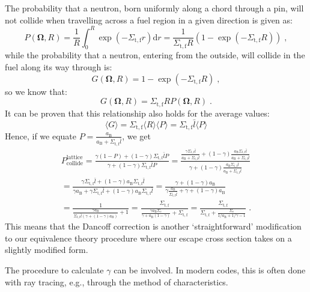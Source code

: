 The probability that a neutron, born uniformly along a chord through a pin, will not collide when travelling across a fuel region in a given direction is given as:
\begin{equation*}
    P(\mathbf{\Omega},R) = \frac{1}{R}\int^R_0 \exp\left(-\Sigma_\mathrm{t,f}r\right)\mathrm{d}r = \frac{1}{\Sigma_\mathrm{t,f}R}\left(1- \exp\left(-\Sigma_\mathrm{t,f}R\right)\right)\;\mathrm{,}
\end{equation*}
 while the probability that a neutron, entering from the outside, will collide in the fuel along its way through is:
\begin{equation*}
    G(\mathbf{\Omega},R) = 1-\exp\left(-\Sigma_\mathrm{t,f}R\right)\;\mathrm{,}
\end{equation*}
so we know that:
\begin{equation*}
    G(\mathbf{\Omega},R) = \Sigma_\mathrm{t,f}RP(\mathbf{\Omega},R)\;\mathrm{.}
\end{equation*}
It can be proven that this relationship also holds for the average values:
\begin{equation}
    \langle G\rangle = \Sigma_\mathrm{t,f}\langle R \rangle\langle P\rangle = \Sigma_\mathrm{t,f}\bar{l}\langle P\rangle
\end{equation}
Hence, if we equate $P = \frac{a_\mathrm{B}}{a_\mathrm{B} + \Sigma_\mathrm{t,f}\bar{l}}$, we get
\begin{equation*}
\begin{split}
    P^\mathrm{lattice}_\mathrm{collide} = \frac{\gamma(1-P) + (1-\gamma)\Sigma_\mathrm{t,f}\bar{l}P}{\gamma+(1-\gamma)\Sigma_\mathrm{t,f}\bar{l}P} = \frac{\frac{\gamma\Sigma_\mathrm{t,f}\bar{l}}{a_\mathrm{B} + \Sigma_\mathrm{t,f}\bar{l}} + (1-\gamma)\frac{a_\mathrm{B}\Sigma_\mathrm{t,f}\bar{l}}{a_\mathrm{B}+\Sigma_\mathrm{t,f}\bar{l}}}{\gamma + (1-\gamma)\frac{a_\mathrm{B}\Sigma_\mathrm{t,f}\bar{l}}{a_\mathrm{B}+\Sigma_\mathrm{t,f}\bar{l}}} \\
    = \frac{\gamma\Sigma_\mathrm{t,f}\bar{l} + (1-\gamma)a_\mathrm{B}\Sigma_\mathrm{t,f}\bar{l}}{\gamma a_\mathrm{B} + \gamma \Sigma_\mathrm{t,f}\bar{l} + (1-\gamma)a_\mathrm{B}\Sigma_\mathrm{t,f}\bar{l}} = \frac{\gamma + (1-\gamma) a_\mathrm{B}}{\gamma \frac{a_\mathrm{B}}{\Sigma_\mathrm{t,f}\bar{l}} + \gamma + (1-\gamma)a_\mathrm{B}}\\
    = \frac{1}{\frac{\gamma a_\mathrm{B}}{\Sigma_\mathrm{t,f}\bar{l}\left(\gamma + (1-\gamma)a_\mathrm{B}\right)} + 1} = \frac{\Sigma_\mathrm{t,f}}{\frac{\gamma a_\mathrm{B}\Sigma_\mathrm{e}}{\gamma + a_\mathrm{B}(1-\gamma)} + \Sigma_\mathrm{t,f}} = \frac{\Sigma_\mathrm{t,f}}{\Sigma_\mathrm{t,f} + \frac{\Sigma_\mathrm{e}}{1/a_\mathrm{B} + 1/\gamma - 1}}\;\mathrm{.}
\end{split}
\end{equation*}
This means that the Dancoff correction is another `straightforward' modification to our equivalence theory procedure where our escape cross section takes on a slightly modified form.

The procedure to calculate $\gamma$ can be involved. In modern codes, this is often done with ray tracing, e.g., through the method of characteristics.